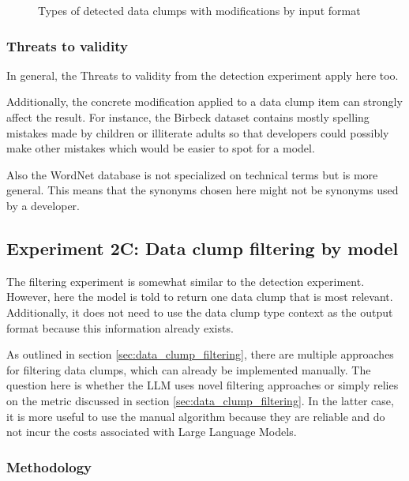 \begin{figure}[ht!]
    \caption{Types of detected data clumps with modifications by input format}
    
    \label{fig:detect_syn_input_type}
\end{figure}

\subsubsection{Threats to validity}
In general, the Threats to validity from the detection experiment apply here too. 

Additionally, the concrete modification applied to a data clump item can strongly affect the result. For instance, the Birbeck dataset contains mostly spelling mistakes made by children or illiterate adults so that developers could possibly make other mistakes which would be easier to spot for a model. 

Also the WordNet database is not specialized on technical terms but is more general. This means that the synonyms chosen here might not be synonyms used by a developer.

\subsection{Experiment 2C: Data clump filtering by model}

The filtering experiment is somewhat similar to the detection experiment. However, here the model is told to return one data clump that is most relevant. Additionally, it does not need to use the data clump type context as the output format because this information already exists. 

As outlined in section \ref{sec:data_clump_filtering}, there are multiple approaches for filtering data clumps, which can already be implemented manually. 
The question here is whether the \ac{LLM} uses novel filtering approaches or simply relies on the metric discussed in section \ref{sec:data_clump_filtering}. In the latter case, it is more useful to use the manual algorithm because they are reliable and do not incur the costs associated with Large Language Models. 

\subsubsection{Methodology}

